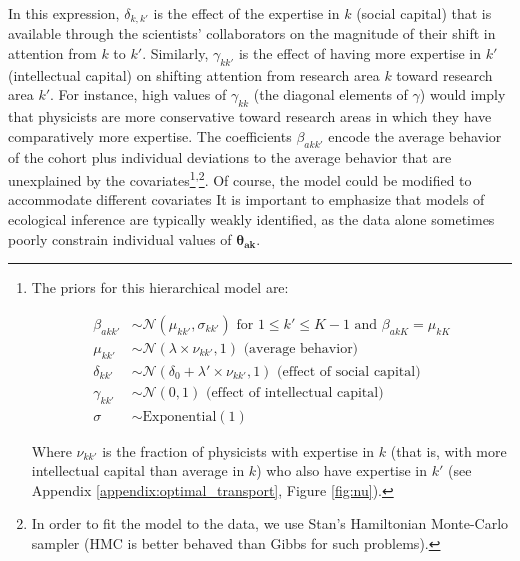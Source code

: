 \documentclass{article}
\begin{document}
In this expression, $\delta_{k,k'}$ is the effect of the expertise in $k$ (social capital) that is available through the scientists' collaborators on the magnitude of their shift in attention from $k$ to $k'$. Similarly, $\gamma_{kk'}$ is the effect of having more expertise in $k'$ (intellectual capital) on shifting attention from research area $k$ toward research area $k'$. For instance, high values of $\gamma_{kk}$ (the diagonal elements of $\gamma$) would imply that physicists are more conservative toward research areas in which they have comparatively more expertise. The coefficients $\beta_{akk'}$ encode the average behavior of the cohort plus individual deviations to the average behavior that are unexplained by the covariates\footnote{The priors for this hierarchical model are:

\begin{align}
    \beta_{akk'} &\sim \mathcal{N}(\mu_{k k'},\sigma_{k k'}) \text{ for } 1\leq k' \leq K-1 \text{ and } \beta_{ak K} = \mu_{kK}\\
    \mu_{k k'} &\sim \mathcal{N}(\lambda \times  \nu_{kk'},1) \text{ (average behavior)}\\
    \delta_{kk'} &\sim \mathcal{N}(\delta_0+\lambda ' \times \nu_{kk'},1) \text { (effect of social capital)}\\
    \gamma_{kk'} &\sim \mathcal{N}(0,1)  \text { (effect of intellectual capital)}\\
    \sigma &\sim \mathrm{Exponential}(1)
\end{align}

Where $\nu_{kk'}$ is the fraction of physicists with expertise in $k$ (that is, with more intellectual capital than average in $k$) who also have expertise in $k'$ (see Appendix \ref{appendix:optimal_transport}, Figure \ref{fig:nu}). 
}\textsuperscript{,}\footnote{In order to fit the model to the data, we use Stan's Hamiltonian Monte-Carlo sampler (HMC is better behaved than Gibbs for such problems).%
}. Of course, the model could be modified to accommodate different covariates %
It is important to emphasize that models of ecological inference are typically weakly identified, as the data alone sometimes poorly constrain individual values of $\bm{\theta_{ak}}$.  %
\end{document}

